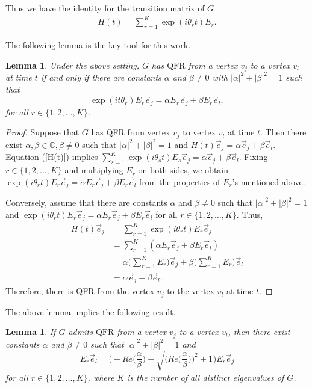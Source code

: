 \documentclass[12pt]{amsart}
\numberwithin{equation}{section}
\newtheorem{lem}[thm]{Lemma}
\theoremstyle{definition}
\theoremstyle{definition} \numberwithin{equation}{section}
\newcommand{\QFR}{\mathrm{QFR}}
\begin{document}
Thus we have the identity for the transition matrix of $G$
\begin{align}\label{H(t)}
  H(t)=\sum_{r=1}^{K}\exp(i\theta_r t)E_r.
\end{align}

The following lemma is the key tool for this work.

 \begin{lem}\label{lemmaidem}
   Under the above setting, $G$ has $\QFR$ from a vertex $v_j$ to a vertex $v_l$ at time $t$ if and only if there are constants $\alpha$ and $\beta \neq 0$ with $|\alpha|^2+|\beta|^2=1$ such that 
    $$
      \exp(it\theta_r) E_r \vec{e}_j = \alpha E_r \vec{e}_j + \beta E_r \vec{e}_l,
    $$
    for all $r \in \{1, 2, \ldots, K \}$.
\end{lem}

\begin{proof}
Suppose that $G$ has QFR from vertex $v_j$ to vertex $v_l$ at time $t$. Then there exist $\alpha, \beta \in \mathbb{C}, \beta \neq 0$ such that $|\alpha|^2 + |\beta|^2 = 1$ and
$H(t)\vec{e}_j = \alpha \vec{e}_j + \beta\vec{e}_l$. Equation (\ref{H(t)}) implies $\sum_{s=1}^{K}\exp(i\theta_s t)E_s \vec{e}_j = \alpha \vec{e}_j + \beta\vec{e}_l$. Fixing $r \in \{1, 2, \ldots, K \}$ and multiplying $E_r$ on both sides, we obtain $\exp(i\theta_r t)E_r \vec{e}_j = \alpha E_r \vec{e}_j + \beta E_r \vec{e}_l$ from the properties of $E_r$'s mentioned above.

Conversely, assume that there are constants $\alpha$ and $\beta \neq 0$ such that $|\alpha|^2+|\beta|^2=1$ and
$
    \exp (i\theta_r t)E_r\vec{e}_j = \alpha E_r \vec{e}_j + \beta E_r \vec{e}_l
$
for all $r \in \{1,2,\ldots, K \}$.
Thus,
\begin{align*}
      H(t)\vec{e}_j &= \sum_{r=1}^{K}\exp{(i\theta_r t)}E_r \vec{e}_j \\
    &= \sum_{r=1}^{K}(\alpha E_r \vec{e}_j + \beta E_r \vec{e}_l) \\
    &= \alpha \bigg(\sum_{r=1}^{K} E_r \bigg)\vec{e}_j + \beta \bigg(\sum_{r=1}^{K} E_r\bigg) \vec{e}_l \\
    &= \alpha \vec{e}_j + \beta \vec{e}_l . 
\end{align*}
Therefore, there is QFR from the vertex $v_j$ to the vertex $v_l$ at time $t$.
\end{proof}

The above lemma implies the following result. 

\begin{lem} \label{thm E_r vec e _v}
    If $G$ admits $\QFR$ from a vertex $v_j$ to a vertex $v_l$, then there exist constants $\alpha$ and $\beta \neq 0$ such that $|\alpha|^2+|\beta|^2=1$ and  $$
    E_r \vec{e}_l = \Big( -Re \Big(\frac{\alpha}{\beta}\Big) \pm \sqrt{\Big(Re \Big( \frac{\alpha}{\beta}\Big)\Big)^2 + 1} \Big ) E_r \vec{e}_j
    $$
    for all $r \in \{1, 2, \ldots, K\}$, where $K$ is the number of all distinct eigenvalues of $G$.
\end{lem}
\end{document}
